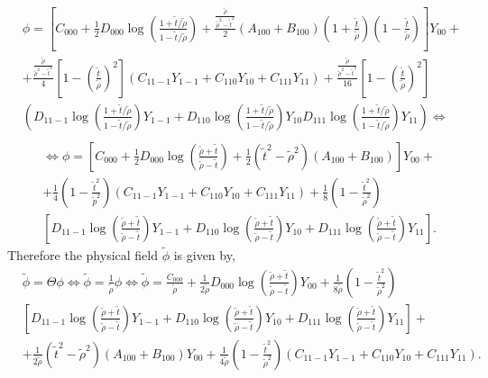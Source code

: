 \begin{align}\label{eq:phi_expansion_3}
  & \phi=\left[C_{000}+\frac{1}{2} D_{000}\log\left(\frac{1+\tilde{t}/\tilde{\rho}}{1-\tilde{t}/\tilde{\rho}}\right)+\frac{\frac{\tilde{\rho}}{\tilde{\rho}^{2}-\tilde{t}^{2}}}{2}\left(A_{100}+B_{100}\right)\left(1+\frac{\tilde{t}}{\tilde{\rho}}\right)\left(1-\frac{\tilde{t}}{\tilde{\rho}}\right)\right]Y_{00} + \nonumber \\
  & + \frac{\frac{\tilde{\rho}}{\tilde{\rho}^{2}-\tilde{t}^{2}}}{4}\left[1-\left(\frac{\tilde{t}}{\tilde{\rho}}\right)^{2}\right]\left(C_{11-1} Y_{1-1}+C_{110} Y_{10}+C_{111} Y_{11}\right) + \frac{\frac{\tilde{\rho}}{\tilde{\rho}^{2}-\tilde{t}^{2}}}{16}\left[1-\left(\frac{\tilde{t}}{\tilde{\rho}}\right)^{2}\right] \nonumber \\
  & \left(D_{11-1} \log \left(\frac{1+\tilde{t}/\tilde{\rho}}{1-\tilde{t}/\tilde{\rho}}\right) Y_{1-1}+D_{110} \log \left(\frac{1+\tilde{t} / \tilde{\rho}}{1-\tilde{t}/\tilde{\rho}}\right) Y_{10} D_{111} \log \left(\frac{1+\tilde{t} / \tilde{\rho}}{1-\tilde{t} / \tilde{\rho}}\right) Y_{11}\right) \Leftrightarrow \nonumber \\
\end{align}
\begin{align}\label{eq:phi_expansion_4}
  & \Leftrightarrow \phi=\left[C_{000}+\frac{1}{2} D_{000} \log \left(\frac{\tilde{\rho}+\tilde{t}}{\tilde{\rho}-\tilde{t}}\right)+\frac{1}{2}\left(\tilde{t}^{2}-\tilde{\rho}^{2}\right)\left(A_{100}+B_{100}\right)\right]Y_{00} + \nonumber \\
  & + \frac{1}{4}\left(1-\frac{\tilde{t}^{2}}{\tilde{p}^{2}}\right)\left(C_{11-1} Y_{1-1}+C_{110}Y_{10}+C_{111} Y_{11}\right)+\frac{1}{8}\left(1-\frac{\tilde{t}^{2}}{\tilde{\rho}^{2}}\right) \nonumber \\
  & \left[D_{11-1}\log \left(\frac{\tilde{\rho}+\tilde{t}}{\tilde{\rho}-\tilde{t}}\right)Y_{1-1}+D_{110} \log \left(\frac{\tilde{\rho}+\tilde{t}}{\tilde{\rho}-\tilde{t}}\right) Y_{10}+D_{111}\log\left(\frac{\tilde{\rho}+\tilde{t}}{\tilde{\rho}-\tilde{t}}\right) Y_{11}\right].
\end{align}
Therefore the physical field $\tilde{\phi}$ is given by,
\begin{align}\label{eq:phi_tilde}
  & \tilde{\phi}=\Theta \phi \Leftrightarrow \tilde{\phi}=\frac{1}{\tilde{\rho}} \phi \Leftrightarrow \tilde{\phi}=\frac{C_{000}}{\tilde{\rho}}+\frac{1}{2 \tilde{\rho}} D_{000} \log \left(\frac{\tilde{\rho}+\tilde{t}}{\tilde{\rho}-\tilde{t}}\right) Y_{00} + \frac{1}{8{\tilde{\rho}}}\left(1-\frac{\tilde{t}^{2}}{\tilde{\rho}^{2}}\right) \nonumber \\
  & \left[D_{11-1}\log \left(\frac{\tilde{\rho}+\tilde{t}}{\tilde{\rho}-\tilde{t}}\right) Y_{1-1}+D_{110} \log\left(\frac{\tilde{\rho}+\tilde{t}}{\tilde{\rho}-\tilde{t}}\right) Y_{10}+D_{111} \log\left(\frac{\tilde{\rho}+\tilde{t}}{\tilde{\rho}-\tilde{t}}\right)Y_{11}\right] + \nonumber \\
  & + \frac{1}{2 \tilde{\rho}}\left(\tilde{t}^{2}-\tilde{\rho}^{2}\right)\left(A_{100}+B_{100}\right) Y_{00}+\frac{1}{4 \tilde{\rho}}\left(1-\frac{\tilde{t}^{2}}{\tilde{\rho}^{2}}\right)\left(C_{11-1} Y_{1-1}+C_{110} Y_{10}+C_{111} Y_{11}\right).
\end{align}
